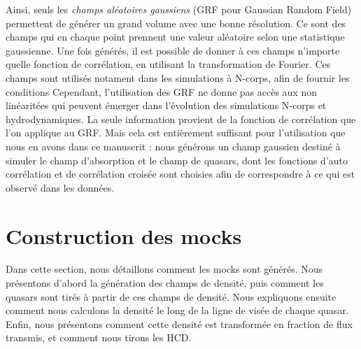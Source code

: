 Ainsi, seuls les \emph{champs aléatoires gaussiens} (GRF pour Gaussian Random Field) permettent de générer un grand volume avec une bonne résolution.
Ce sont des champs qui en chaque point prennent une valeur aléatoire selon une statistique gaussienne.
Une fois générés, il est possible de donner à ces champs n'importe quelle fonction de corrélation, en utilisant la transformation de Fourier.
Ces champs sont utilisés notament dans les simulations à N-corps, afin de fournir les conditions 
Cependant, l'utilisation des GRF ne donne pas accès aux non linéaritées qui peuvent émerger dans l'évolution des simulations N-corps et hydrodynamiques. La seule information provient de la fonction de corrélation que l'on applique au GRF.
Mais cela est entièrement suffisant pour l'utilisation que nous en avons dans ce manuscrit : nous générons un champ gaussien destiné à simuler le champ d'absorption \lya{} et le champ de quasars, dont les fonctions d'auto corrélation et de corrélation croisée sont choisies afin de correspondre à ce qui est observé dans les données.


\section{Construction des mocks}
Dans cette section, nous détaillons comment les mocks sont générés.
Nous présentons d'abord la génération des champs de densité,
puis comment les quasars sont tirés à partir de ces champs de densité.
Nous expliquons ensuite comment nous calculons la densité le long de la ligne de visée de chaque quasar.
Enfin, nous présentons comment cette densité est transformée en fraction de flux transmis, et comment nous tirons les HCD.


